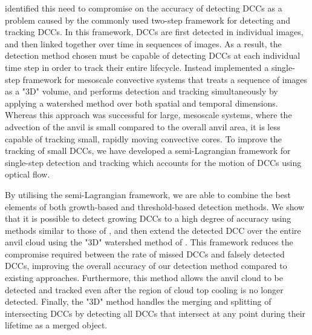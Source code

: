 \citet{fiolleau_algorithm_2013} identified this need to compromise on the accuracy of detecting DCCs as a problem caused by the commonly used two-step framework for detecting and tracking DCCs.
In this framework, DCCs are first detected in individual images, and then linked together over time in sequences of images.
As a result, the detection method chosen must be capable of detecting DCCs at each individual time step in order to track their entire lifecycle.
Instead \citet{fiolleau_algorithm_2013} implemented a single-step framework for mesoscale convective systems that treats a sequence of images as a "3D" volume, and performs detection and tracking simultaneously by applying a watershed method over both spatial and temporal dimensions.
Whereas this approach was successful for large, mesoscale systems, where the advection of the anvil is small compared to the overall anvil area, it is less capable of tracking small, rapidly moving convective cores.
To improve the tracking of small DCCs, we have developed a semi-Lagrangian framework for single-step detection and tracking which accounts for the motion of DCCs using optical flow.

By utilising the semi-Lagrangian framework, we are able to combine the best elements of both growth-based and threshold-based detection methods.
We show that it is possible to detect growing DCCs to a high degree of accuracy using methods similar to those of \citet{zinner_cb-tram:_2008}, and then extend the detected DCC over the entire anvil cloud using the "3D" watershed method of \citet{fiolleau_algorithm_2013}.
This framework reduces the compromise required between the rate of missed DCCs and falsely detected DCCs, improving the overall accuracy of our detection method compared to existing approaches.
Furthermore, this method allows the anvil cloud to be detected and tracked even after the region of cloud top cooling is no longer detected.
Finally, the "3D" method handles the merging and splitting of intersecting DCCs by detecting all DCCs that intersect at any point during their lifetime as a merged object.



